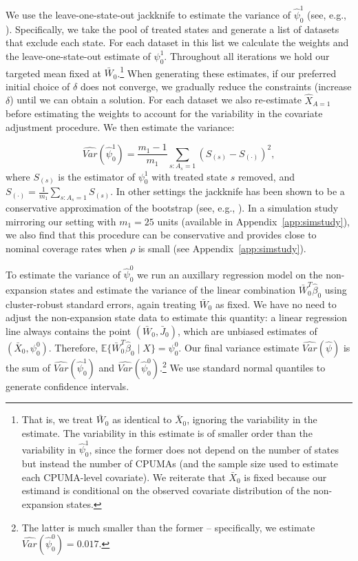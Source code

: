 \documentclass[aoas]{imsart}
\theoremstyle{plain}
\theoremstyle{remark}
\begin{document}
We use the leave-one-state-out jackknife to estimate the variance of $\hat{\psi}_0^1$ (see, e.g., \cite{cameron2015practitioner}). Specifically, we take the pool of treated states and generate a list of datasets that exclude each state. For each dataset in this list we calculate the weights and the leave-one-state-out estimate of $\psi_0^1$. Throughout all iterations we hold our targeted mean fixed at $\bar{W}_0$.\footnote{That is, we treat $\bar{W}_0$ as identical to $\bar{X}_0$, ignoring the variability in the estimate. The variability in this estimate is of smaller order than the variability in $\hat{\psi}_0^1$, since the former does not depend on the number of states but instead the number of CPUMAs (and the sample size used to estimate each CPUMA-level covariate). We reiterate that $\bar{X}_0$ is fixed because our estimand is conditional on the observed covariate distribution of the non-expansion states.} When generating these estimates, if our preferred initial choice of $\delta$ does not converge, we gradually reduce the constraints (increase $\delta$) until we can obtain a solution. For each dataset we also re-estimate $\hat{X}_{A=1}$ before estimating the weights to account for the variability in the covariate adjustment procedure. We then estimate the variance:

\[ \hat{Var}(\hat{\psi}_0^1) = \frac{m_1 - 1}{m_1} \sum_{s:A_s = 1} \left( S_{(s)} - S_{(\cdot)} \right)^2,\]
%
where $S_{(s)}$ is the estimator of $\psi_0^1$ with treated state $s$ removed, and $S_{(\cdot)} = \frac{1}{m_1} \sum_{s:A_s=1} S_{(s)}$. In other settings the jackknife has been shown to be a conservative approximation of the bootstrap (see, e.g., \cite{efron1981jackknife}). In a simulation study mirroring our setting with $m_1 = 25$ units (available in Appendix~\ref{app:simstudy}), we also find that this procedure can be conservative and provides close to nominal coverage rates when $\rho$ is small (see Appendix~\ref{app:simstudy}).

To estimate the variance of $\hat{\psi}_0^0$ we run an auxillary regression model on the non-expansion states and estimate the variance of the linear combination $\bar{W}_0^T\hat{\beta}_0$ using cluster-robust standard errors, again treating $\bar{W}_0$ as fixed. We have no need to adjust the non-expansion state data to estimate this quantity: a linear regression line always contains the point $(\bar{W}_0, \bar{J}_0)$, which are unbiased estimates of $(\bar{X}_0, \psi_0^0)$. Therefore, $\mathbb{E}\{\bar{W}_0^T\hat{\beta}_0 \mid X\} = \psi_0^0$. Our final variance estimate $\hat{Var}(\hat{\psi})$ is the sum of $\hat{Var}(\hat{\psi}_0^1)$ and $\hat{Var}(\hat{\psi}_0^0)$.\footnote{The latter is much smaller than the former -- specifically, we estimate $\hat{Var}(\hat{\psi}_0^0) = 0.017$.} We use standard normal quantiles to generate confidence intervals.
\end{document}
